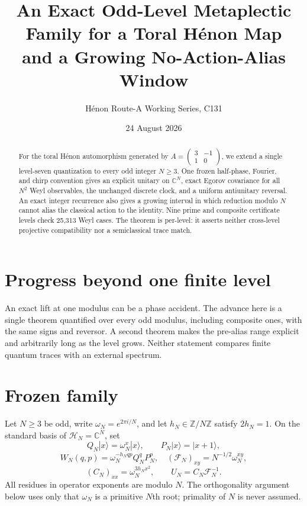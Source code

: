 \documentclass[11pt]{article}
\title{An Exact Odd-Level Metaplectic Family for a Toral H\'enon Map\\
and a Growing No-Action-Alias Window}
\author{H\'enon Route-A Working Series, C131}
\date{24 August 2026}
\begin{document}
\maketitle
\begin{abstract}
For the toral H\'enon automorphism generated by
$A=\left(\begin{smallmatrix}3&-1\\1&0\end{smallmatrix}\right)$, we extend a
single level-seven quantization to every odd integer $N\ge3$.  One frozen
half-phase, Fourier, and chirp convention gives an explicit unitary on
$\mathbb C^N$, exact Egorov covariance for all $N^2$ Weyl observables, the
unchanged discrete clock, and a uniform antiunitary reversal.  An exact
integer recurrence also gives a growing interval in which reduction modulo
$N$ cannot alias the classical action to the identity.  Nine prime and
composite certificate levels check 25,313 Weyl cases.  The theorem is
per-level: it asserts neither cross-level projective compatibility nor a
semiclassical trace match.
\end{abstract}

\section{Progress beyond one finite level}

An exact lift at one modulus can be a phase accident.  The advance here is a
single theorem quantified over every odd modulus, including composite ones,
with the same signs and reversor.  A second theorem makes the pre-alias range
explicit and arbitrarily long as the level grows.  Neither statement compares
finite quantum traces with an external spectrum.

\section{Frozen family}

Let $N\ge3$ be odd, write $\omega_N=e^{2\pi i/N}$, and let
$h_N\in\mathbb Z/N\mathbb Z$ satisfy $2h_N=1$.  On the standard basis of
$\mathcal H_N=\mathbb C^N$, set
\[
 Q_N|x\rangle=\omega_N^x|x\rangle,\qquad
 P_N|x\rangle=|x+1\rangle,
\]
\[
 W_N(q,p)=\omega_N^{-h_Nqp}Q_N^qP_N^p,\quad
 (\mathcal F_N)_{xy}=N^{-1/2}\omega_N^{xy},
\]
\[
 (C_N)_{xx}=\omega_N^{3h_Nx^2},\qquad
 U_N=C_N\mathcal F_N^{-1}.
\]
All residues in operator exponents are modulo $N$.
The orthogonality argument below uses only that $\omega_N$ is a primitive
$N$th root; primality of $N$ is never assumed.
\end{document}
